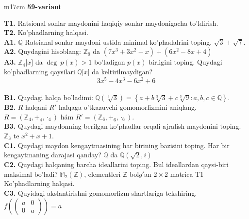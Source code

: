 \documentclass{article}
\begin{document}
\begin{tabular}{m{17cm}}
\textbf{59-variant}
\newline

\textbf{T1.} Ratsional sonlar maydonini haqiqiy sonlar maydonigacha to'ldirish. \\
\textbf{T2.} Ko'phadlarning halqasi. \\
\textbf{A1.} \(\mathbb{Q}\) Ratsianal sonlar maydoni ustida minimal ko'phadalrini toping.
\(\sqrt{3} + \sqrt{7}\). \\
\textbf{A2.} Quydagini hisoblang:
\(\mathbb{Z}_{9}\) da \(\left( 7x^{3} + 3x^{2} - x \right) + \left( 6x^{2} - 8x + 4 \right)\) \\
\textbf{A3.} \(\mathbb{Z}_{4}\lbrack x\rbrack\) da \(\deg\ p(x) > 1\) bo'ladigan \(p(x)\) birligini toping. Quydagi ko'phadlarning qaysilari \(\mathbb{Q\lbrack}x\rbrack\) da keltirilmaydigan?
\[3x^{5} - 4x^{3} - 6x^{2} + 6\] \\
\textbf{B1.} Quydagi halqa bo'ladimi:
\(\mathbb{Q}\left( \sqrt[3]{3} \right) = \left\{ a + b\sqrt[3]{3} + c\sqrt[3]{9}:a,b,c \in \mathbb{Q} \right\}\). \\
\textbf{B2.} \(R\) halqani \(R'\) halqaga o'tkazuvchi gomomorfizmini aniqlang.
\(R = (\mathbb{Z}_{4}, +_{4}, \cdot_{4})\) hám \(R' = (\mathbb{Z}_{6}, +_{6}, \cdot_{6})\). \\
\textbf{B3.} Quydagi maydonning berilgan ko'phadlar orqali ajralish maydonini toping.
\(\mathbb{Z}_{3}\) te \(x^{2} + x + 1\). \\
\textbf{C1.} Quydagi maydon kengaytmasining har birining bazisini toping. Har bir kengaytmaning darajasi qanday?
\(\mathbb{Q}\) da \(\mathbb{Q}\left( \sqrt{2},i \right)\) \\
\textbf{C2.} Quydagi halqaning barcha ideallarini toping. Bul ideallardan qaysi-biri maksimal bo'ladi?
\(\mathbb{M}_{2}\left( \mathbb{Z} \right)\), elementleri \(\mathbb{Z}\) bol\(g'\)an \(2 \times 2\) matrica
T1 Ko'phadlarning halqasi. \\
\textbf{C3.} Quyidagi akslantirishni gomomorfizm shartlariga tekshiring. \(f\left( \begin{pmatrix}
a & 0 \\
0 & a
\end{pmatrix} \right) = a\) \\

\end{tabular}
\vspace{1cm}
\end{document}
